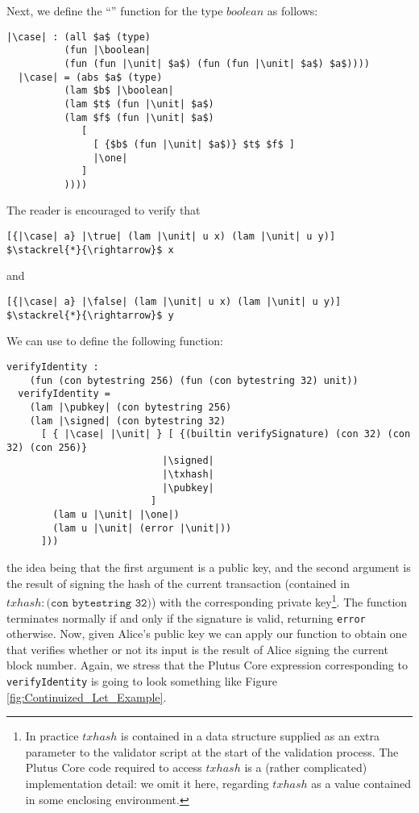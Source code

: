 \documentclass[../plutus-core-specification.tex]{subfiles}
\begin{document}
\noindent Next, we define the ``\case'' function for the type $boolean$ as follows:
\begin{lstlisting}[basicstyle=\ttfamily,mathescape]
  |\case| : (all $a$ (type)
          (fun |\boolean|
          (fun (fun |\unit| $a$) (fun (fun |\unit| $a$) $a$))))
  |\case| = (abs $a$ (type)
          (lam $b$ |\boolean|
          (lam $t$ (fun |\unit| $a$)
          (lam $f$ (fun |\unit| $a$)
             [
               [ {$b$ (fun |\unit| $a$)} $t$ $f$ ]
               |\one|
             ]
          ))))
\end{lstlisting}
The reader is encouraged to verify that
\begin{lstlisting}[basicstyle=\ttfamily,mathescape]
  [{|\case| a} |\true| (lam |\unit| u x) (lam |\unit| u y)] $\stackrel{*}{\rightarrow}$ x
\end{lstlisting}
and
\begin{lstlisting}[basicstyle=\ttfamily,mathescape]
  [{|\case| a} |\false| (lam |\unit| u x) (lam |\unit| u y)] $\stackrel{*}{\rightarrow}$ y
\end{lstlisting}

\noindent We can use \case{} to define the following function:
\begin{lstlisting}[basicstyle=\ttfamily,mathescape]
  verifyIdentity :
    (fun (con bytestring 256) (fun (con bytestring 32) unit))
  verifyIdentity =
    (lam |\pubkey| (con bytestring 256)
    (lam |\signed| (con bytestring 32)
      [ { |\case| |\unit| } [ {(builtin verifySignature) (con 32) (con 32) (con 256)}
                           |\signed|
                           |\txhash|
                           |\pubkey|
                         ]
        (lam u |\unit| |\one|)
        (lam u |\unit| (error |\unit|))
      ]))
\end{lstlisting}
the idea being that the first argument is a public key, and the second
argument is the result of signing the hash of the current transaction
(contained in $\mathit{txhash} : \texttt{(con bytestring 32)}$) with
the corresponding private key\footnote{In practice $\mathit{txhash}$
  is contained in a data structure supplied as an extra parameter to
  the validator script at the start of the validation process.  The
  Plutus Core code required to access $\mathit{txhash}$ is a (rather
  complicated) implementation detail: we omit it here, regarding
  $\mathit{txhash}$ as a value contained in some enclosing
  environment.}.  The function terminates normally if and only if the
signature is valid, returning \texttt{error} otherwise. Now, given
Alice's public key we can apply our function to obtain one that
verifies whether or not its input is the result of Alice signing the
current block number. Again, we stress that the Plutus Core expression
corresponding to \texttt{verifyIdentity} is going to look something
like Figure \ref{fig:Continuized_Let_Example}.
\end{document}
